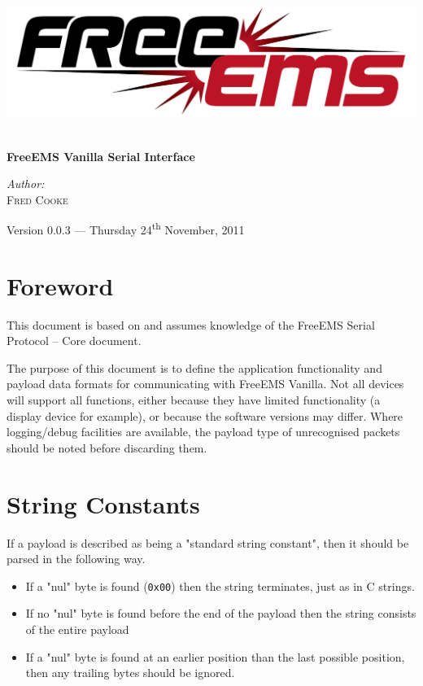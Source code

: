 \documentclass[12pt,a4paper,titlepage]{article}
\begin{document}
\begin{titlepage} 
\begin{center}

\includegraphics[width=1\textwidth]{./logos/freeems}\\[1cm] \vfill

\HRule \\[0.8cm]
{ \huge \bfseries FreeEMS Vanilla Serial Interface }\\[0.4cm]
\HRule \vfill

\Large \emph{Author:}\\
\textsc{Fred Cooke} \vfill

{\large Version 0.0.3 --- Thursday 24\textsuperscript{th} November, 2011}






\section {Foreword}

This document is based on and assumes knowledge of the FreeEMS Serial Protocol -- Core document.

The purpose of this document is to define the application functionality and payload data formats for communicating with FreeEMS Vanilla. Not all devices will support all functions, either because they have limited functionality (a display device for example), or because the software versions may differ. Where logging/debug facilities are available, the payload type of unrecognised packets should be noted before discarding them.




\section{String Constants}

If a payload is described as being a "standard string constant", then it should be parsed in the following way.

\begin{itemize}
\item If a "nul" byte is found (\texttt{0x00}) then the string terminates, just as in C strings.
\item If no "nul" byte is found before the end of the payload then the string consists of the entire payload
\item If a "nul" byte is found at an earlier position than the last possible position, then any trailing bytes  should be ignored.
\end{itemize}





\end{center}
\end{titlepage}
\end{document}
